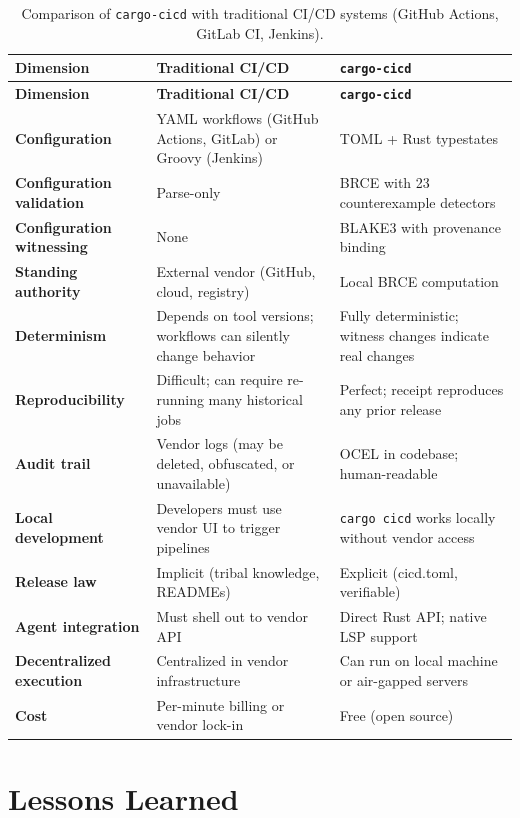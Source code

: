 \begin{longtable}{@{}p{3.0cm}p{3.2cm}p{3.2cm}@{}}
\caption{Comparison of \texttt{cargo-cicd} with traditional CI/CD systems (GitHub Actions, GitLab CI, Jenkins).}
\label{tab:cargo-cicd-comparison} \\
\toprule
\textbf{Dimension} & \textbf{Traditional CI/CD} & \textbf{\texttt{cargo-cicd}} \\
\midrule
\endfirsthead
\toprule \textbf{Dimension} & \textbf{Traditional CI/CD} & \textbf{\texttt{cargo-cicd}} \\
\midrule
\endhead
\textbf{Configuration} & YAML workflows (GitHub Actions, GitLab) or Groovy (Jenkins) & TOML + Rust typestates \\
\textbf{Configuration validation} & Parse-only & BRCE with 23 counterexample detectors \\
\textbf{Configuration witnessing} & None & BLAKE3 with provenance binding \\
\textbf{Standing authority} & External vendor (GitHub, cloud, registry) & Local BRCE computation \\
\textbf{Determinism} & Depends on tool versions; workflows can silently change behavior & Fully deterministic; witness changes indicate real changes \\
\textbf{Reproducibility} & Difficult; can require re-running many historical jobs & Perfect; receipt reproduces any prior release \\
\textbf{Audit trail} & Vendor logs (may be deleted, obfuscated, or unavailable) & OCEL in codebase; human-readable \\
\textbf{Local development} & Developers must use vendor UI to trigger pipelines & \texttt{cargo cicd} works locally without vendor access \\
\textbf{Release law} & Implicit (tribal knowledge, READMEs) & Explicit (cicd.toml, verifiable) \\
\textbf{Agent integration} & Must shell out to vendor API & Direct Rust API; native LSP support \\
\textbf{Decentralized execution} & Centralized in vendor infrastructure & Can run on local machine or air-gapped servers \\
\textbf{Cost} & Per-minute billing or vendor lock-in & Free (open source) \\
\bottomrule
\end{longtable}

\section{Lessons Learned}

